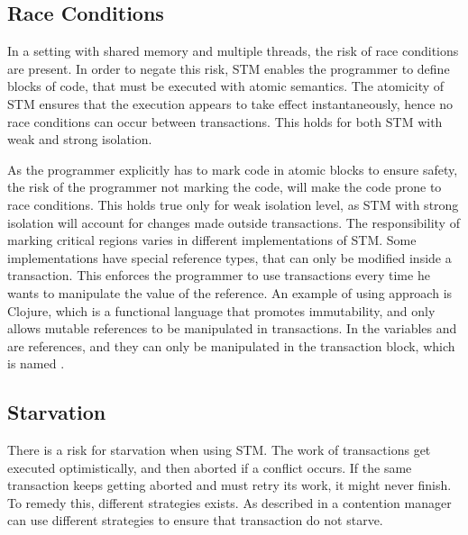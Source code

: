 \subsection{Race Conditions}
In a setting with shared memory and multiple threads, the risk of race conditions are present. In order to negate this risk, \ac{STM} enables the programmer to define blocks of code, that must be executed with atomic semantics. The atomicity of \ac{STM} ensures that the execution appears to take effect instantaneously, hence no race conditions can occur between transactions. This holds for both \ac{STM} with weak and strong isolation.

As the programmer explicitly has to mark code in atomic blocks to ensure safety, the risk of the programmer not marking the code, will make the code prone to race conditions. This holds true only for weak isolation level, as \ac{STM} with strong isolation will account for changes made outside transactions. The responsibility of marking critical regions varies in different implementations of \ac{STM}. Some implementations have special reference types, that can only be modified inside a transaction. This enforces the programmer to use transactions every time he wants to manipulate the value of the reference. An example of using approach is Clojure, which is a functional language that promotes immutability, and only allows mutable references to be manipulated in transactions. In  the variables  and  are references, and they can only be manipulated in the transaction block, which is named .

\subsection{Starvation}
There is a risk for starvation when using \ac{STM}. The work of transactions get executed optimistically, and then aborted if a conflict occurs. If the same transaction keeps getting aborted and must retry its work, it might never finish. To remedy this, different strategies exists. As described in  a contention manager can use different strategies to ensure that transaction do not starve. 

